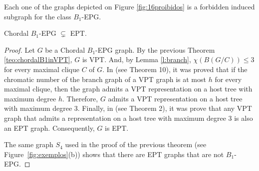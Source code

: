   \begin{corollary}\label{c:prohib}
  Each one of the graphs depicted on Figure \ref{fig:16proibidos} is a forbidden induced subgraph for the class $B_1$-EPG.
  \end{corollary}







\begin{theorem}\label{teo:b1epgept}
Chordal $B_1$-EPG $\subsetneq$ EPT. 
\end{theorem}

\begin{proof}
Let $G$ be a  Chordal $B_1$-EPG graph. By the previous Theorem \ref{teo:chordalB1inVPT}, $G$ is VPT. And,  by Lemma \ref{l:branch}, $\chi(B(G/C))\leq 3$ for every maximal clique $C$ of $G$.   In \cite{alcon2014recognizing} (see Theorem 10), it was proved that if the chromatic number of the branch graph of a VPT graph is at most $h$ for every maximal clique, then the graph admits a VPT representation on a host tree with maximum degree $h$.  Therefore, $G$ admits a VPT representation on a host tree with maximum degree 3.  Finally, in \cite{ golumbic1985edge} (see Theorem 2), it was prove that any VPT graph that  admits a representation on a host tree with maximum degree 3 is also an EPT graph. Consequently,  $G$ is EPT.

The same graph   $S_4$ used in the proof of the previous theorem (see Figure~\ref{fig:exemplos}(b)) shows that there are EPT graphs that are not $B_1$-EPG. \end{proof} 


